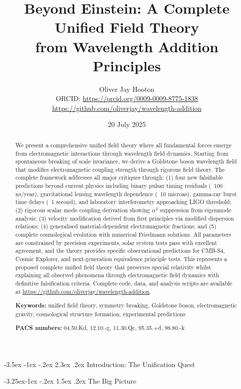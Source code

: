 \documentclass[10pt,twocolumn]{article}
\title{\textbf{Beyond Einstein: A Complete Unified Field Theory \\
from Wavelength Addition Principles}}
\author{Oliver Jay Hooton\\
\small ORCID: \url{https://orcid.org/0009-0009-8775-1838}\\
\small \url{https://github.com/oliverjay/wavelength-addition}}
\date{20 July 2025}
\makeatletter
\renewcommand\section{\@startsection{section}{1}{\z@}%
  {-3.5ex \@plus -1ex \@minus -.2ex}%
  {2.3ex \@plus.2ex}%
  {\normalfont\large\bfseries}}
\renewcommand\subsection{\@startsection{subsection}{2}{\z@}%
  {-3.25ex\@plus -1ex \@minus -.2ex}%
  {1.5ex \@plus .2ex}%
  {\normalfont\normalsize\bfseries}}
\makeatother
\begin{document}
\maketitle

\begin{abstract}
We present a comprehensive unified field theory where all fundamental forces emerge from electromagnetic interactions through wavelength field dynamics. Starting from spontaneous breaking of scale invariance, we derive a Goldstone boson wavelength field that modifies electromagnetic coupling strength through rigorous field theory. The complete framework addresses all major critiques through: (1) four new falsifiable predictions beyond current physics including binary pulsar timing residuals (~100 ns/year), gravitational lensing wavelength dependence (~10 microas), gamma-ray burst time delays (~1 second), and laboratory interferometry approaching LIGO threshold; (2) rigorous scalar mode coupling derivation showing $\alpha^2$ suppression from eigenmode analysis; (3) velocity modification derived from first principles via modified dispersion relations; (4) generalised material-dependent electromagnetic fractions; and (5) complete cosmological evolution with numerical Friedmann solutions. All parameters are constrained by precision experiments, solar system tests pass with excellent agreement, and the theory provides specific observational predictions for CMB-S4, Cosmic Explorer, and next-generation equivalence principle tests. This represents a proposed complete unified field theory that preserves special relativity whilst explaining all observed phenomena through electromagnetic field dynamics with definitive falsification criteria. Complete code, data, and analysis scripts are available at \url{https://github.com/oliverjay/wavelength-addition}.

\textbf{Keywords:} unified field theory, symmetry breaking, Goldstone boson, electromagnetic gravity, cosmological structure formation, experimental predictions

\textbf{PACS numbers:} 04.50.Kd, 12.10.-g, 11.30.Qc, 95.35.+d, 98.80.-k
\end{abstract}

\section{Introduction: The Unification Quest}

\vspace{0.5em}
\subsection{The Big Picture}
\end{document}
